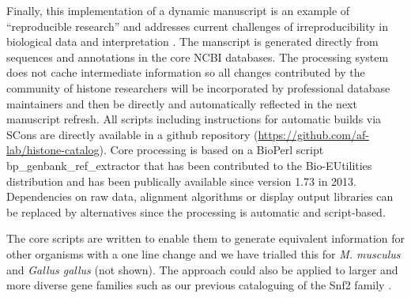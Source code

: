 	Finally, this implementation of a dynamic manuscript 
	is an example of ``reproducible research'' \citep{reproducible-research-bioinformatics,reproducible-research-law}
	and addresses current challenges of irreproducibility in biological data and interpretation \citep{ErrorProne2012,OpenPrograms2012}.
	The manscript is generated directly from sequences and annotations in the core NCBI databases.
	The processing system does not cache intermediate information so all changes contributed by
	the community of histone researchers will be incorporated by professional database maintainers 
	and then be directly and automatically reflected in the next manuscript refresh.
	All scripts including instructions for automatic builds via SCons \citep{SCons2005}
	are directly available in a github repository (\url{https://github.com/af-lab/histone-catalog}).
	Core processing is based on a BioPerl \citep{BioPerl2002} script bp\_genbank\_ref\_extractor
	that has been contributed to the Bio-EUtilities distribution 
	and has been publically available since version 1.73 in 2013.
	Dependencies on raw data, alignment algorithms or display output libraries
	can be replaced by alternatives since the processing is automatic and script-based.

	The core scripts are written to enable them to generate 
	equivalent information for other organisms with a one line change 
	and we have trialled this for \textit{M. musculus} and \textit{Gallus gallus} (not shown).
	The approach could also be applied to larger and more diverse gene families such as
	our previous cataloguing of the Snf2 family \citep{andrew-snf2-catalogue}.